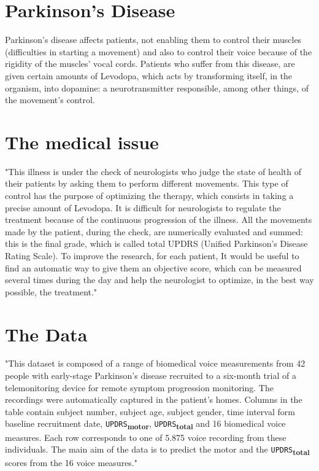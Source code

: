 \documentclass[12pt]{report}
\begin{document}
\section{Parkinson's Disease}
Parkinson's disease affects patients, not enabling them to control their muscles (difficulties in starting a movement) and also to control their voice because of the rigidity of the muscles' vocal cords. Patients who suffer from this disease, are given certain amounts of Levodopa, which acts by transforming itself, in the organism, into dopamine: a neurotransmitter responsible, among other things,  of the movement's control.
\section{The medical issue}
"This illness is under the check of neurologists who judge the state of health of their patients by asking them to perform different movements. This type of control has the purpose of optimizing the therapy, which consists in taking a precise amount of Levodopa. It is difficult for neurologists to regulate the treatment because of the continuous progression of the illness. All the movements made by the patient, during the check, are numerically evaluated and summed: this is the final grade, which is called total UPDRS (Unified Parkinson's Disease Rating Scale).
To improve the research, for each patient, It would be useful to find an automatic way to give them an objective score, which can be measured several times during the day and help the neurologist to optimize, in the best way possible, the treatment." \cite{MV1}

\section{The Data}
"This dataset is composed of a range of biomedical voice measurements from 42 people with early-stage Parkinson's disease recruited to a six-month trial of a telemonitoring device for remote symptom progression monitoring. The recordings were automatically captured in the patient's homes.
Columns in the table contain subject number, subject age, subject gender, time interval form baseline recruitment date, \texttt{UPDRS}\textsubscript{\textbf{motor}}, \texttt{UPDRS}\textsubscript{\textbf{total}} and 16 biomedical voice measures. Each row corresponds to one of 5.875 voice recording from these individuals. The main aim of the data is to predict the motor and the \texttt{UPDRS}\textsubscript{\textbf{total}} scores from the 16 voice measures." \cite{site}
\end{document}
